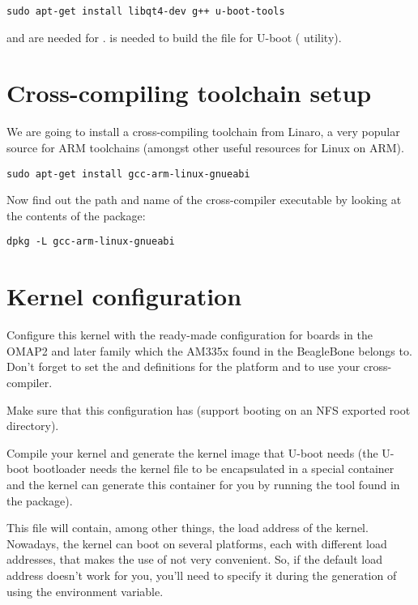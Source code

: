 \begin{verbatim}
sudo apt-get install libqt4-dev g++ u-boot-tools
\end{verbatim}

 and  are needed for .
 is needed to build the  file for
U-boot ( utility).

\section{Cross-compiling toolchain setup}

We are going to install a cross-compiling toolchain from Linaro, a
very popular source for ARM toolchains (amongst other useful resources
for Linux on ARM).

\begin{verbatim}
sudo apt-get install gcc-arm-linux-gnueabi
\end{verbatim}

Now find out the path and name of the cross-compiler executable by looking at the contents of the package:

\begin{verbatim}
dpkg -L gcc-arm-linux-gnueabi
\end{verbatim}

\section{Kernel configuration}

Configure this kernel with the ready-made configuration for boards in
the OMAP2 and later family which the AM335x found in the BeagleBone
belongs to. Don't forget to set the  and
 definitions for the  platform and to
use your cross-compiler.

Make sure that this configuration has  (support
booting on an NFS exported root directory).

Compile your kernel and generate the  kernel image that
U-boot needs (the U-boot bootloader needs the kernel 
file to be encapsulated in a special container and the kernel
 can generate this container for you by running the
 tool found in the  package).

This file will contain, among other things, the load address of the
kernel. Nowadays, the kernel can boot on several platforms, each with
different load addresses, that makes the use of  not very
convenient. So, if the default load address doesn't work for you, you'll
need to specify it during the generation of  using the
 environment variable.

